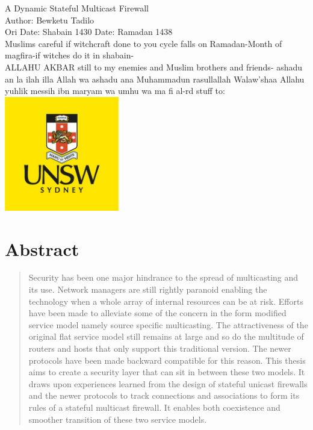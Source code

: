 \documentclass[11pt,left=2cm,bottom=2cm,oneside]{book}
\begin{document}
\pagenumbering{}
\begin{titlepage}
\nopagebreak
\centering
{\LARGE A Dynamic Stateful Multicast Firewall}\\
\vspace*{2cm}
{\Large Author: Bewketu Tadilo}\\
\vspace*{2cm}
{\Large Ori Date: Shabain 1430}
{\Large Date: Ramadan 1438}\\
{Muslims careful if witchcraft done to you cycle falls on Ramadan-Month of magfira-if witches do it in shabain-}\\ 
{\Large ALLAHU AKBAR still to my enemies and Muslim brothers and friends- ashadu an la ilah illa Allah wa ashadu ana Muhammadun rasullallah
Walaw'shaa Allahu yuhlik messih ibn maryam wa umhu wa ma fi al-rd
}
\vspace{3cm}
{\hspace{-2cm}\Large stuff to:}\\
\vspace{1.83cm}
\includegraphics[height=5cm]{unsw-logo.jpg}
\end{titlepage}

 \section*{\centering Abstract}
\begin{quotation}
Security has been one major hindrance to the spread of multicasting and its use. Network managers are still rightly paranoid
enabling the technology when a whole array of internal resources
can be at risk. Efforts have been made to alleviate some of the
concern in the form modified service model namely source specific
multicasting. The attractiveness of the original flat service model
still remains at large and so do the multitude of routers and hosts
that only support this traditional version. The newer protocols
have been made backward compatible for this reason. This thesis aims to create a security layer that can sit in between these
two models. It draws upon experiences learned from the design
of stateful unicast firewalls and the newer protocols to track connections and associations to form its rules of a stateful multicast
firewall. It enables both coexistence and smoother transition of
these two service models.
\end{quotation}
\clearpage
\vspace*{8cm}
\end{document}
